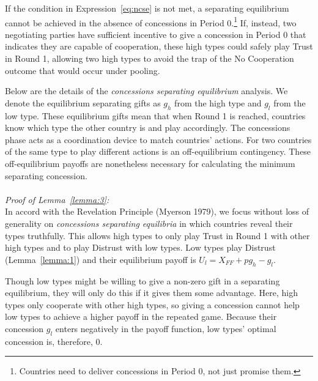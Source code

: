 \documentclass[bibtex,autowc]{apsr_submission}
\begin{document}
{If the condition in Expression~\ref{eq:ncse} is not met, a separating equilibrium cannot be achieved in the absence of concessions in Period 0.\footnote{Countries need to deliver concessions in Period 0, not just promise them.} If, instead, two negotiating parties have sufficient incentive to give a concession in Period 0 that indicates they are capable of cooperation, these high types could safely play Trust in Round 1, allowing two high types to avoid the trap of the No Cooperation outcome that would occur under pooling. 

Below are the details of the \emph{concessions separating equilibrium} analysis. We denote the equilibrium separating gifts as $g_h$ from the high type and $g_l$ from the low type. These equilibrium gifts mean that when Round 1 is reached, countries know which type the other country is and play accordingly. The concessions phase acts as a coordination device to match countries' actions. For two countries of the same type to play different actions is an off-equilibrium contingency. These off-equilibrium payoffs are nonetheless necessary for calculating the minimum separating concession. 
\\
\\
\emph{Proof of Lemma~\ref{lemma:3}:}\\
In accord with the Revelation Principle (Myerson 1979), we focus without loss of generality on \emph{concessions separating equilibria} in which countries reveal their types truthfully. This allows high types to only play Trust in Round 1 with other high types and to play Distrust with low types. Low types play Distrust (Lemma~\ref{lemma:1}) and their equilibrium payoff is $U_l=X_{FF}+ pg_h-g_l$.

Though low types might be willing to give a non-zero gift in a separating equilibrium, they will only do this if it gives them some advantage. Here, high types only cooperate with other high types, so giving a concession cannot help low types to achieve a higher payoff in the repeated game. Because their concession $g_l$ enters negatively in the payoff function, low types' optimal concession is, therefore, 0.

}
\end{document}
